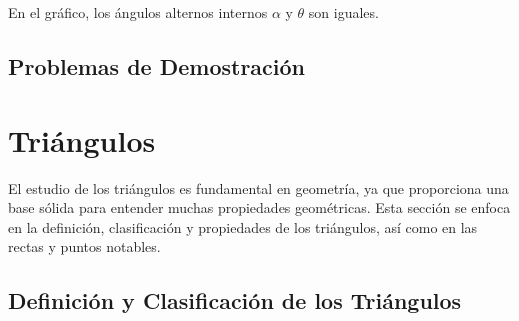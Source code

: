 
En el gráfico, los ángulos alternos internos \(\alpha\) y \(\theta\) son iguales.

\subsection{Problemas de Demostración}





\section{Triángulos} %

El estudio de los triángulos es fundamental en geometría, ya que proporciona una base sólida para entender muchas propiedades geométricas. Esta sección se enfoca en la definición, clasificación y propiedades de los triángulos, así como en las rectas y puntos notables.

\subsection{Definición y Clasificación de los Triángulos}

